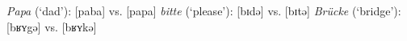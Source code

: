 \documentclass[output=paper]{langsci/langscibook}
\begin{document}
%
%

 
\ea\label{ex:stuhl:10}  
\textit{Papa} (‘dad’): {[paba]} vs. {[papa]}
\ex\label{ex:stuhl:11}  
{\textit{bitte}} (‘please’): {[bɪd{ə}]} vs. {[bɪtə]} 
\ex\label{ex:stuhl:12}    
{\textit{Brücke}} (‘bridge’): {[bʁʏgə]} vs. {[bʁʏkə]}
\z 
 
\end{document}

